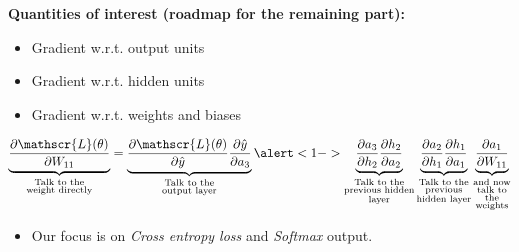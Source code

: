 \savestack{\nnhiddencompone}{}
\savestack{\nnhiddencomp}{}
\savestack{\nnhiddensimp}{}

\begin{frame}
\end{frame}

\begin{frame}
  \begin{overlayarea}{\textwidth}{\textheight}
    \textbf{Quantities of interest (roadmap for the remaining part):}
    \begin{itemize}
      \item Gradient w.r.t. output units
      \item \alert<1->{Gradient w.r.t. hidden units}
      \item Gradient w.r.t. weights and biases
    \end{itemize}

    \begin{align*}
      \underbrace{\frac{\partial \mathscr{L}(\theta)}{\partial W_{11}}}_
      {\substack{\text{Talk to the}\\ \text{weight directly}}}
      =
      \underbrace{\frac{\partial \mathscr{L}(\theta)}{\partial \hat{y}} \frac{\partial \hat{y}}{\partial a_{3}}}_
        {\substack{\text{Talk to the} \\ \text{output layer}}}
      \alert<1->{\underbrace{\frac{\partial a_{3}}{\partial h_{2}} \frac{\partial h_{2}}{\partial a_{2}}}_
        {\substack{\text{Talk to the} \\ \text{previous hidden} \\ \text{layer}}}
        \underbrace{\frac{\partial a_{2}}{\partial h_{1}} \frac{\partial h_{1}}{\partial a_{1}}}_
        {\substack{\text{Talk to the} \\ \text{previous} \\ \text{hidden layer}}}}
      \underbrace{\frac{\partial a_{1}}{\partial W_{11}}}_
      {\substack{\text{and now} \\ \text{talk to} \\ \text{the} \\ \text{weights}}}
    \end{align*}

    \begin{itemize}
      \item<1-> Our focus is on \textit{Cross entropy loss} and \textit{Softmax} output.
    \end{itemize}
  \end{overlayarea}
\end{frame}

